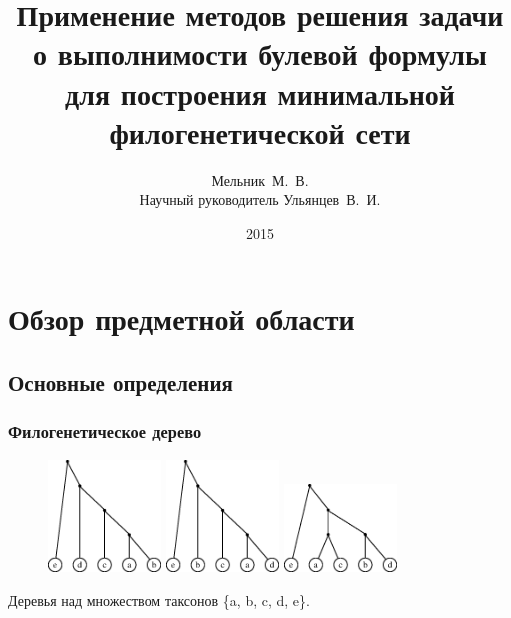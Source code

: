 \documentclass[hyperref={unicode}]{beamer}
\title{Применение методов решения задачи о выполнимости булевой формулы для построения минимальной филогенетической сети}
\author[]{Мельник~М.~В.\\
Научный руководитель Ульянцев~В.~И.}
\institute{Университет~ИТМО}
\date[]{2015}
\begin{document}
\begin{frame}
  \titlepage
\end{frame}


\section{Обзор предметной области}

\subsection{Основные определения}





\begin{frame}
\frametitle{Филогенетическое дерево}

\centering

\begin{figure}[t]
	\includegraphics[width=3cm]{img/inp1.eps}
	\hspace{5mm}
	\includegraphics[width=3cm]{img/inp2.eps}
	\hspace{5mm}
	\includegraphics[width=3cm]{img/inp3.eps}
\end{figure}

Деревья над множеством таксонов \{a, b, c, d, e\}.

\end{frame}
\end{document}
